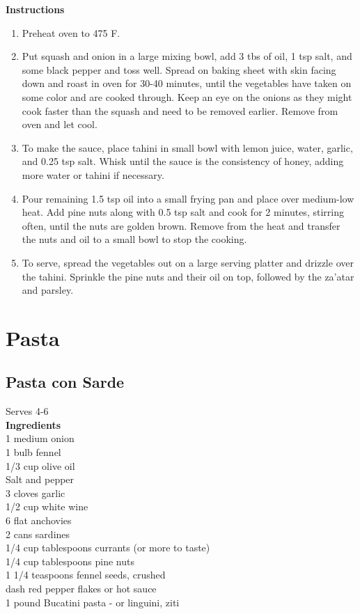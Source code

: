 \documentclass{article}
\numberwithin{figure}{section}
\numberwithin{equation}{section}
\begin{document}
{\bf Instructions}
\begin{enumerate}
\item Preheat oven to 475 F.

\item Put squash and onion in a large mixing bowl, add 3 tbs of oil, 1 tsp salt, and some black pepper and toss well. Spread on baking sheet with skin facing down and roast in oven for 30-40 minutes, until the vegetables have taken on some color and are cooked through. Keep an eye on the onions as they might cook faster than the squash and need to be removed earlier. Remove from oven and let cool.
\item To make the sauce, place tahini in small bowl with lemon juice, water, garlic, and 0.25 tsp salt. Whisk until the sauce is the consistency of honey, adding more water or tahini if necessary.
\item Pour remaining 1.5 tsp oil into a small frying pan and place over medium-low heat. Add pine nuts along with 0.5 tsp salt and cook for 2 minutes, stirring often, until the nuts are golden brown. Remove from the heat and transfer the nuts and oil to a small bowl to stop the cooking.
\item To serve, spread the vegetables out on a large serving platter and drizzle over the tahini. Sprinkle the pine nuts and their oil on top, followed by the za'atar and parsley.
\end{enumerate}


\pagebreak
\section{Pasta}

\pagebreak
\subsection{Pasta con Sarde}
Serves 4-6\\

{\bf Ingredients}\\
1 medium onion\\
1 bulb fennel\\
1/3 cup olive oil\\
Salt and pepper\\
3 cloves garlic\\
1/2 cup white wine\\
6 flat anchovies\\
2 cans sardines\\
1/4 cup tablespoons currants (or more to taste)\\
1/4 cup tablespoons pine nuts\\
1 1/4 teaspoons fennel seeds, crushed\\
dash red pepper flakes or hot sauce\\
1 pound Bucatini pasta - or linguini, ziti\\
\end{document}

